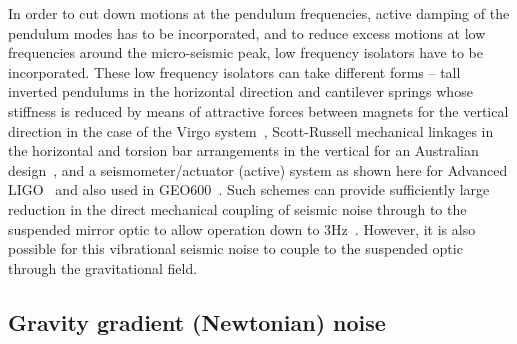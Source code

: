 \documentclass{article}
\begin{document}

In order to cut down motions at the pendulum frequencies, active damping of the
pendulum modes has to be incorporated, and to reduce excess motions at low
frequencies around the micro-seismic peak, low frequency isolators have to be
incorporated. These low frequency isolators can take different forms -- tall
inverted pendulums in the horizontal direction and cantilever springs whose
stiffness is reduced by means of attractive forces between magnets for the
vertical direction in the case of the Virgo system~\cite{Losurdo},
Scott-Russell mechanical linkages in the horizontal and torsion bar arrangements
in the vertical for an Australian design~\cite{Winterflood}, and a
seismometer/actuator (active) system as shown here for Advanced
LIGO~\cite{Abbott:2002} and also used in GEO600~\cite{Plissi2}.  Such schemes
can provide sufficiently large reduction in the direct mechanical coupling of
seismic noise through to the suspended mirror optic to allow operation down to
3Hz~\cite{Braccini:1993,ETweb}. However, it is also possible for this
vibrational seismic noise to couple to the suspended optic through the
gravitational field.


\subsection{Gravity gradient (Newtonian) noise}
\label{subsection:gravitygradient}
\end{document}
